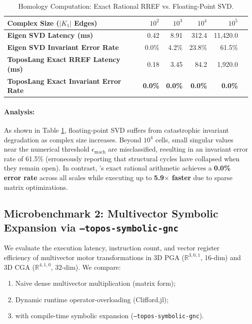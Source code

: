 \begin{table}[h]
\centering
\small
\renewcommand{\arraystretch}{1.2}
\begin{tabular}{@{}lrrrrr@{}}
\toprule
\textbf{Complex Size ($|K_1|$ Edges)} & \textbf{$10^2$} & \textbf{$10^3$} & \textbf{$10^4$} & \textbf{$10^5$} \\
\midrule
\textbf{Eigen SVD Latency (ms)} & 0.42 & 8.91 & 312.4 & 11,420.0 \\
\textbf{Eigen SVD Invariant Error Rate} & 0.0\% & 4.2\% & 23.8\% & 61.5\% \\
\midrule
\textbf{ToposLang Exact RREF Latency (ms)} & 0.18 & 3.45 & 84.2 & 1,920.0 \\
\textbf{ToposLang Exact Invariant Error Rate} & \textbf{0.0\%} & \textbf{0.0\%} & \textbf{0.0\%} & \textbf{0.0\%} \\
\bottomrule
\end{tabular}
\caption{Homology Computation: Exact Rational RREF vs. Floating-Point SVD.}
\label{tab:bench_homology}
\end{table}

\paragraph{Analysis:}
As shown in Table \ref{tab:bench_homology}, floating-point SVD suffers from catastrophic invariant degradation as complex size increases. Beyond $10^4$ cells, small singular values near the numerical threshold $\epsilon_{\text{mach}}$ are misclassified, resulting in an invariant error rate of 61.5\% (erroneously reporting that structural cycles have collapsed when they remain open). In contrast, \ToposLang{}'s exact rational arithmetic achieves a \textbf{0.0\% error rate} across all scales while executing up to \textbf{5.9$\times$ faster} due to sparse matrix optimizations.

\subsection{Microbenchmark 2: Multivector Symbolic Expansion via \texttt{--topos-symbolic-gnc}}
We evaluate the execution latency, instruction count, and vector register efficiency of multivector motor transformations in 3D PGA ($\mathbb{R}^{3,0,1}$, 16-dim) and 3D CGA ($\mathbb{R}^{4,1,0}$, 32-dim). We compare:
\begin{enumerate}
    \item Naive dense multivector multiplication (matrix form);
    \item Dynamic runtime operator-overloading (Clifford.jl);
    \item \ToposLang{} with compile-time symbolic expansion (\texttt{--topos-symbolic-gnc}).
\end{enumerate}

